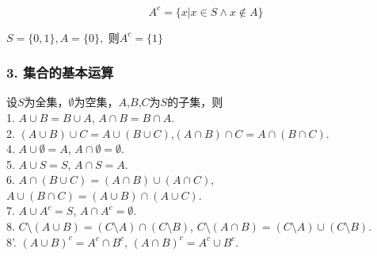 \documentclass{beamer}
\begin{document}
\begin{CJK*}{UTF8}{gbsn}
\begin{frame}
\begin{minipage}{0.69\linewidth}
\begin{Def}
    \begin{equation*}
      A^c = \{x|x \in S \land x \notin A\}
    \end{equation*}
  \end{Def}\pause
\end{minipage}
\begin{minipage}{0.29\linewidth}
  \end{minipage}\pause
    \begin{Ex}
        $S = \{0,1\}, A =  \{0\},$ 则$A^c = \{1\}$
    \end{Ex}
\end{frame}


\begin{frame}
  \frametitle{3. 集合的基本运算}
  \begin{Thm}
设$S$为全集，$\emptyset$为空集，$A$,$B$,$C$为$S$的子集，则\\
1. $A \cup B = B \cup A$, $A \cap B = B \cap A$.\\
2. $(A \cup B) \cup C = A \cup (B \cup C)$,$(A \cap B) \cap C = A \cap (B \cap C)$.\\
4. $A \cup \emptyset = A$, $A \cap \emptyset = \emptyset$.\\
5. $A \cup S = S$, $A \cap S = A$.\\
6. $A \cap (B \cup C) = (A \cap B) \cup (A \cap C)$, $A \cup (B \cap C) = (A \cup B) \cap (A \cup C)$.\\
7. $A \cup A^c = S$, $A \cap A^c = \emptyset$.\\
8. $C\setminus (A \cup B) = (C \setminus A) \cap (C \setminus B)$, $C \setminus (A \cap B) = (C \setminus A) \cup (C \setminus B)$.\\ 
8'. $(A \cup B)^c = A^c \cap B^c$, $(A \cap B)^c = A^c \cup B^c$.\\
  \end{Thm}
\end{frame}


\end{CJK*}
\end{document}

